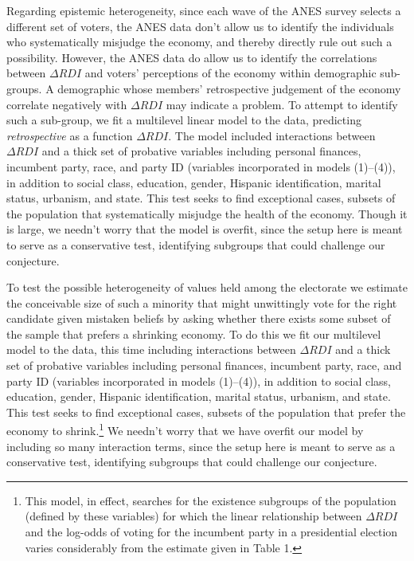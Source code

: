 \documentclass[11pt]{article}
\begin{document}
Regarding epistemic heterogeneity, since each wave of the ANES survey selects a different set of voters, the ANES data don't allow us to identify the individuals who
systematically misjudge the economy, and thereby directly rule out
such a possibility. 
However, the ANES data do allow us to identify the correlations between
$\Delta RDI$ and voters' perceptions of the economy within demographic
sub-groups. 
A demographic whose members' retrospective judgement of the economy
correlate negatively with $\Delta RDI$ may indicate a problem.
To attempt to identify such a sub-group, we fit a multilevel linear model to the
data, predicting \emph{retrospective} as a function $\Delta RDI$. 
The model included interactions between $\Delta RDI$ and a thick set of probative variables including personal finances, incumbent party, race, and party ID (variables incorporated in models (1)--(4)), %
in addition to social class, education, gender, Hispanic
identification, marital status, urbanism, and state. This test seeks
to find exceptional cases, subsets of the population that
systematically misjudge the health of the economy. 
Though it is large, we needn't worry that the model is overfit, since the setup here is meant to serve as a conservative test, identifying subgroups that could challenge our conjecture. 

To test the possible heterogeneity of values held among the electorate we estimate the conceivable size of such a minority that might unwittingly vote for the right candidate given mistaken beliefs by asking whether there exists some subset of the sample that prefers a shrinking economy. %
To do this we fit our multilevel model to the data, this time including interactions between $\Delta RDI$ and a thick set of probative variables including personal finances, incumbent party, race, and party ID (variables incorporated in models (1)--(4)), %
in addition to social class, education, gender, Hispanic identification, marital status, urbanism, and state. This test seeks to find exceptional cases, subsets of the population that prefer the economy to shrink.\footnote{
This model, in effect, searches for the existence subgroups of the population (defined by these variables) for which the linear relationship between $\Delta RDI$ and the log-odds of voting for the incumbent party in a presidential election varies considerably from the estimate given in Table 1.}  We needn't worry that we have overfit our model by including so many interaction terms, since the setup here is meant to serve as a conservative test, identifying subgroups that could challenge our conjecture. 
\end{document}
